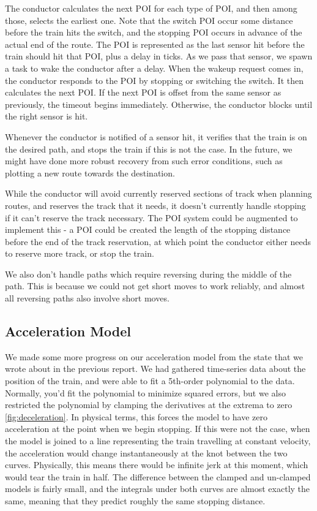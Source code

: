 \documentclass{article}
\begin{document}
The conductor calculates the next POI for each type of POI, and then among those, selects the earliest one.
Note that the switch POI occur some distance before the train hits the switch,
and the stopping POI occurs in advance of the actual end of the route.
The POI is represented as the last sensor hit before the train should hit that POI, plus a delay in ticks.
As we pass that sensor, we spawn a task to wake the conductor after a delay.
When the wakeup request comes in, the conductor responds to the POI by stopping or switching the switch.
It then calculates the next POI\@.
If the next POI is offset from the same sensor as previously, the timeout begins immediately.
Otherwise, the conductor blocks until the right sensor is hit.

Whenever the conductor is notified of a sensor hit, it verifies that the train is on the desired path, and stops
the train if this is not the case.
In the future, we might have done more robust recovery from such error conditions, such as plotting a new route towards
the destination.

While the conductor will avoid currently reserved sections of track when planning routes, and reserves the track
that it needs, it doesn't currently handle stopping if it can't reserve the track necessary.
The POI system could be augmented to implement this - a POI could be created the length of the stopping distance before the
end of the track reservation, at which point the conductor either needs to reserve more track, or stop the train.

We also don't handle paths which require reversing during the middle of the path.
This is because we could not get short moves to work reliably,
and almost all reversing paths also involve short moves.

\subsection{Acceleration Model}
We made some more progress on our acceleration model from the state that we wrote about in the previous report.
We had gathered time-series data about the position of the train, and were able to fit a 5th-order polynomial to
the data.
Normally, you'd fit the polynomial to minimize squared errors, but we also restricted the polynomial by clamping
the derivatives at the extrema to zero \ref{fig:deceleration}.
In physical terms, this forces the model to have zero acceleration at the point
when we begin stopping.
If this were not the case, when the model is joined to a line representing
the train travelling at constant velocity, the acceleration would change instantaneously
at the knot between the two curves.
Physically, this means there would be infinite jerk at this moment, which would tear the
train in half.
The difference between the clamped and un-clamped models is fairly small, and the
integrals under both curves are almost exactly the same, meaning that they predict
roughly the same stopping distance.
\end{document}
